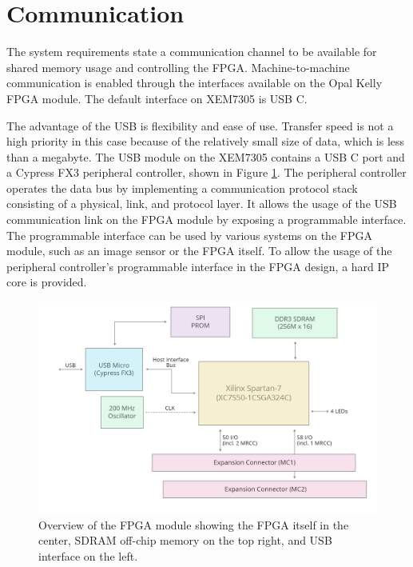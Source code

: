 \documentclass[12pt]{report}
\begin{document}
\section{Communication}
The system requirements state a communication channel to be available for shared memory usage and controlling the FPGA. Machine-to-machine communication is enabled through the interfaces available on the Opal Kelly FPGA module. The default interface on XEM7305 is USB C. \citep{XEM7305Man}
\par
The advantage of the USB is flexibility and ease of use. Transfer speed is not a high priority in this case because of the relatively small size of data, which is less than a megabyte. The USB module on the XEM7305 contains a USB C port and a Cypress FX3 peripheral controller, shown in Figure \ref{fig:xemOverview}.
The peripheral controller operates the data bus by implementing a communication protocol stack consisting of a physical, link, and protocol layer. It allows the usage of the USB communication link on the FPGA module by exposing a programmable interface. The programmable interface can be used by various systems on the FPGA module, such as an image sensor or the FPGA itself. To allow the usage of the peripheral controller's programmable interface in the FPGA design, a hard IP core is provided. \citep{XEM7305Man} \citep{FX3Man}

\begin{figure}
    \centering
    \includegraphics[scale=0.4]{figures/2XEM7305-BlockDiagram.png}
    \caption{Overview of the FPGA module showing the FPGA itself in the center, SDRAM off-chip memory on the top right, and USB interface on the left. \citep{XEM7305Man}}
    \label{fig:xemOverview}
\end{figure}
\end{document}

